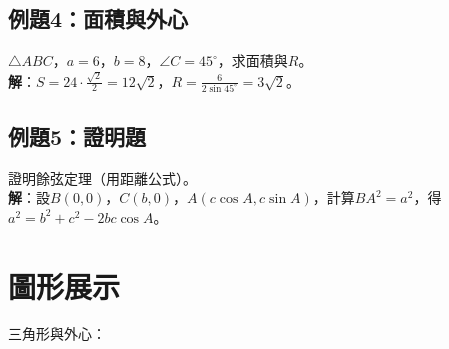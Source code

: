\subsection{例題4：面積與外心}
$\triangle ABC$，$a=6$，$b=8$，$\angle C=45^\circ$，求面積與$R$。\\
\textbf{解}：$S = 24 \cdot \frac{\sqrt{2}}{2} = 12\sqrt{2}$，$R = \frac{6}{2 \sin 45^\circ} = 3\sqrt{2}$。

\subsection{例題5：證明題}
證明餘弦定理（用距離公式）。\\
\textbf{解}：設$B(0,0)$，$C(b,0)$，$A(c \cos A, c \sin A)$，計算$BA^2 = a^2$，得$a^2 = b^2 + c^2 - 2bc \cos A$。

\section{圖形展示}
三角形與外心：

